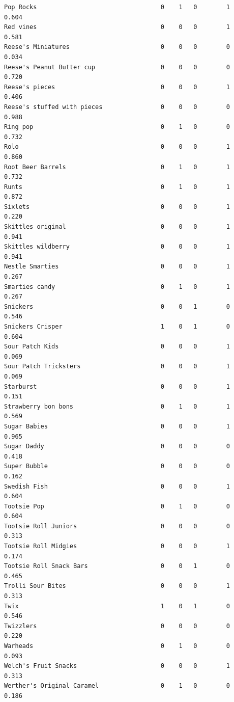 \documentclass[
  letterpaper,
  DIV=11,
  numbers=noendperiod]{scrartcl}
\begin{document}
\begin{verbatim}
Pop Rocks                                  0    1   0        1        0.604
Red vines                                  0    0   0        1        0.581
Reese's Miniatures                         0    0   0        0        0.034
Reese's Peanut Butter cup                  0    0   0        0        0.720
Reese's pieces                             0    0   0        1        0.406
Reese's stuffed with pieces                0    0   0        0        0.988
Ring pop                                   0    1   0        0        0.732
Rolo                                       0    0   0        1        0.860
Root Beer Barrels                          0    1   0        1        0.732
Runts                                      0    1   0        1        0.872
Sixlets                                    0    0   0        1        0.220
Skittles original                          0    0   0        1        0.941
Skittles wildberry                         0    0   0        1        0.941
Nestle Smarties                            0    0   0        1        0.267
Smarties candy                             0    1   0        1        0.267
Snickers                                   0    0   1        0        0.546
Snickers Crisper                           1    0   1        0        0.604
Sour Patch Kids                            0    0   0        1        0.069
Sour Patch Tricksters                      0    0   0        1        0.069
Starburst                                  0    0   0        1        0.151
Strawberry bon bons                        0    1   0        1        0.569
Sugar Babies                               0    0   0        1        0.965
Sugar Daddy                                0    0   0        0        0.418
Super Bubble                               0    0   0        0        0.162
Swedish Fish                               0    0   0        1        0.604
Tootsie Pop                                0    1   0        0        0.604
Tootsie Roll Juniors                       0    0   0        0        0.313
Tootsie Roll Midgies                       0    0   0        1        0.174
Tootsie Roll Snack Bars                    0    0   1        0        0.465
Trolli Sour Bites                          0    0   0        1        0.313
Twix                                       1    0   1        0        0.546
Twizzlers                                  0    0   0        0        0.220
Warheads                                   0    1   0        0        0.093
Welch's Fruit Snacks                       0    0   0        1        0.313
Werther's Original Caramel                 0    1   0        0        0.186

\end{verbatim}
\end{document}
